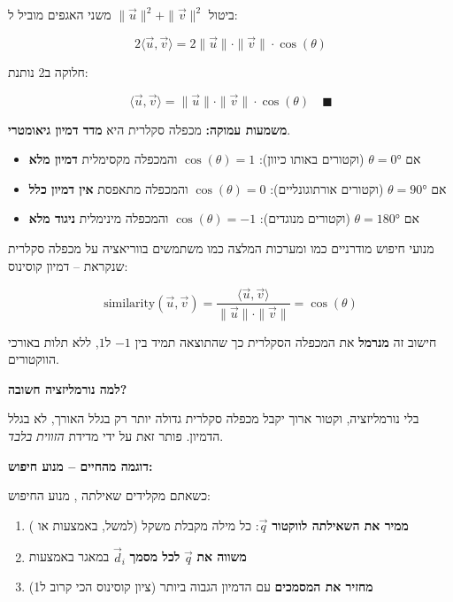 ביטול $\|\vec{u}\|^2 + \|\vec{v}\|^2$ משני האגפים מוביל ל:

\[
\num{2}\langle \vec{u}, \vec{v} \rangle = \num{2}\|\vec{u}\| \cdot \|\vec{v}\| \cdot \cos(\theta)
\]

חלוקה ב\en{-}\num{2} נותנת:

\[
\langle \vec{u}, \vec{v} \rangle = \|\vec{u}\| \cdot \|\vec{v}\| \cdot \cos(\theta) \quad \blacksquare
\]

\textbf{משמעות עמוקה:} מכפלה סקלרית היא \textbf{מדד דמיון גיאומטרי}.

\begin{itemize}
\item אם $\theta = \num{0}°$ (וקטורים באותו כיוון): $\cos(\theta) = \num{1}$ והמכפלה מקסימלית \rarrow{} \textbf{דמיון מלא}
\item אם $\theta = \num{90}°$ (וקטורים אורתוגונליים): $\cos(\theta) = \num{0}$ והמכפלה מתאפסת \rarrow{} \textbf{אין דמיון כלל}
\item אם $\theta = \num{180}°$ (וקטורים מנוגדים): $\cos(\theta) = \num{-1}$ והמכפלה מינימלית \rarrow{} \textbf{ניגוד מלא}
\end{itemize}


מנועי חיפוש מודרניים כמו  ומערכות המלצה כמו  משתמשים בווריאציה על מכפלה סקלרית שנקראת \textbf{} – דמיון קוסינוס:

\begin{equation}
\text{similarity}(\vec{u}, \vec{v}) = \frac{\langle \vec{u}, \vec{v} \rangle}{\|\vec{u}\| \cdot \|\vec{v}\|} = \cos(\theta)
\end{equation}

חישוב זה \textbf{מנרמל} את המכפלה הסקלרית כך שהתוצאה תמיד בין $\num{-1}$ ל\en{-}$\num{+1}$, ללא תלות באורכי הווקטורים.

\textbf{למה נורמליזציה חשובה?}

בלי נורמליזציה, וקטור ארוך יקבל מכפלה סקלרית גדולה יותר רק בגלל האורך, לא בגלל הדמיון.  פותר זאת על ידי מדידת \textit{הזווית בלבד}.

\textbf{דוגמה מהחיים – מנוע חיפוש:}

כשאתם מקלידים שאילתה , מנוע החיפוש:

\begin{enumerate}
\item \textbf{ממיר את השאילתה לווקטור} $\vec{q}$: כל מילה מקבלת משקל (למשל, באמצעות  או  \cite{mikolov2013})
\item \textbf{משווה את} $\vec{q}$ \textbf{לכל מסמך} $\vec{d}_i$ במאגר באמצעות 
\item \textbf{מחזיר את המסמכים} עם הדמיון הגבוה ביותר (ציון קוסינוס הכי קרוב ל\en{-}\num{1})
\end{enumerate}


